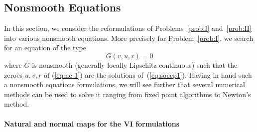 \subsection{Nonsmooth Equations}
\label{Sec:NonsmoothEquations}
In this section, we consider the reformulations of Problems~\ref{prob:I} and~\ref{prob:II} into various nonsmooth equations. More precisely for Problem~\ref{prob:I}, we search for an equation of the type
\begin{equation}
  \label{eq:ne-1}
  G(v,u,r) = 0
\end{equation}
where $G$ is nonsmooth (generally locally Lipschitz continuous) such that the zeroes $u,v,r$ of (\ref{eq:ne-1}) are the solutions of~(\ref{eq:soccp1}). Having in hand such a nonsmooth equations formulations, we will see further that several numerical methods can be used to solve it ranging from fixed point algorithms to Newton's method.

\paragraph{Natural and normal maps for the VI formulations}

